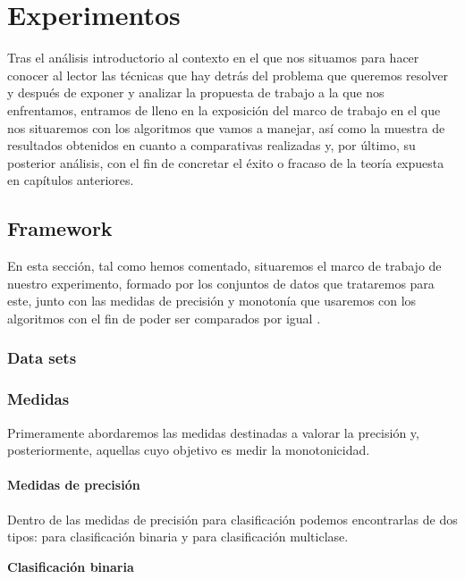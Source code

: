 \chapter[Capítulo 6. Experimentos]{Experimentos}

Tras el análisis introductorio al contexto en el que nos situamos para hacer conocer al lector las técnicas que hay detrás del problema que queremos resolver y después de exponer y analizar la propuesta de trabajo a la que nos enfrentamos, entramos de lleno en la exposición del marco de trabajo en el que nos situaremos con los algoritmos que vamos a manejar, así como la muestra de resultados obtenidos en cuanto a comparativas realizadas y, por último, su posterior análisis, con el fin de concretar el éxito o fracaso de la teoría expuesta en capítulos anteriores.

\section{Framework}

En esta sección, tal como hemos comentado, situaremos el marco de trabajo de nuestro experimento, formado por los conjuntos de datos que trataremos para este, junto con las medidas de precisión y monotonía que usaremos con los algoritmos con el fin de poder ser comparados por igual \cite{ref15}.

\subsection{Data sets}

\subsection{Medidas}

Primeramente abordaremos las medidas destinadas a valorar la precisión y, posteriormente, aquellas cuyo objetivo es medir la monotonicidad.

\subsubsection{Medidas de precisión}

Dentro de las medidas de precisión para clasificación podemos encontrarlas de dos tipos: para clasificación binaria y para clasificación multiclase.

\textbf{Clasificación binaria}

